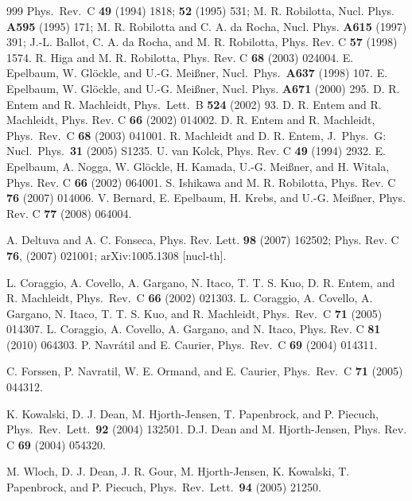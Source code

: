 \documentclass[sort&compress,preprint,3p]{elsarticle}
\begin{document}
\begin{thebibliography}{999}
Phys.\ Rev.\ C {\bf 49} (1994) 1818;
{\bf 52} (1995) 531;
M. R. Robilotta, Nucl. Phys. {\bf A595} (1995) 171;
M. R. Robilotta and C. A. da Rocha, 
Nucl. Phys. {\bf A615} (1997) 391;
J.-L. Ballot, C. A. da Rocha, and M. R. Robilotta, 
Phys. Rev. C {\bf 57} (1998) 1574.
R. Higa and M. R. Robilotta, 
Phys. Rev. C {\bf 68} (2003) 024004.
E. Epelbaum, W. Gl\"ockle, and U.-G. Mei\ss ner, 
Nucl.\ Phys.\ {\bf A637} (1998) 107.
E. Epelbaum, W. Gl\"ockle, and U.-G. Mei\ss ner,
Nucl. Phys. {\bf A671} (2000) 295.
 D. R. Entem and R. Machleidt,
Phys.\ Lett.\ B {\bf 524} (2002) 93.
 D. R. Entem and R. Machleidt,
Phys. Rev. C {\bf 66} (2002) 014002.
 D. R. Entem and R. Machleidt,
Phys.\ Rev.\ C {\bf 68} (2003) 041001.
  R. Machleidt and D. R. Entem,
J.\ Phys.\ G: Nucl.\ Phys.\ {\bf 31} (2005) S1235.
 U. van Kolck, Phys. Rev. C {\bf 49} (1994) 2932.
 E. Epelbaum, A. Nogga, W. Gl\"ockle, H. Kamada, U.-G. Mei\ss ner, and H. Witala,
Phys. Rev. C {\bf 66} (2002) 064001.
S. Ishikawa and M. R. Robilotta, 
{ Phys. Rev.} C {\bf 76} (2007) 014006.
V. Bernard, E. Epelbaum, H. Krebs, and U.-G. Mei\ss ner,
{ Phys. Rev.} C {\bf 77} (2008) 064004.

A. Deltuva and A. C. Fonseca, 
Phys. Rev. Lett. {\bf 98} (2007) 162502;
Phys. Rev. C {\bf 76}, (2007) 021001;
arXiv:1005.1308 [nucl-th].

L. Coraggio, A. Covello, A. Gargano, N. Itaco, T. T. S. Kuo, D. R. Entem, and R. Machleidt,
Phys.\ Rev.\ C {\bf 66} (2002) 021303.
L. Coraggio, A. Covello, A. Gargano, N. Itaco, T. T. S. Kuo, and R. Machleidt,
Phys.\ Rev.\ C {\bf 71} (2005) 014307.
L. Coraggio, A. Covello, A. Gargano, and N. Itaco,
Phys. Rev. C {\bf 81} (2010) 064303. 
 P. Navr\'atil and E. Caurier, Phys.\ Rev.\ C
{\bf 69} (2004) 014311.

C. Forssen, P. Navratil, W. E. Ormand, and E. Caurier,
Phys.\ Rev.\ C {\bf 71} (2005) 044312.

K. Kowalski, D. J. Dean, M. Hjorth-Jensen, T. Papenbrock, and P. Piecuch, 
Phys.\ Rev.\ Lett.\ {\bf 92} (2004) 132501.
 D.J. Dean and M. Hjorth-Jensen,
Phys. Rev. C {\bf 69} (2004) 054320.


M. Wloch, D. J. Dean, J. R. Gour, M. Hjorth-Jensen, K. Kowalski, T. Papenbrock, and P. Piecuch,
Phys.\ Rev.\ Lett.\ {\bf 94} (2005) 21250.



\end{thebibliography}
\end{document}
